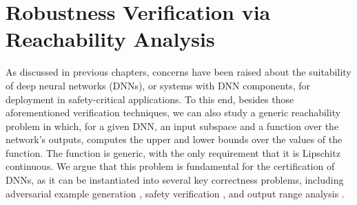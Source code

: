 
\newcommand{\obj}{o}
\newcommand{\off}{w}


\def \eg{{\em e.g.,}}
\def \ie{{\em i.e.,}}
\def \etc{{\em etc.}}
\def \mm{{\em mm}}
\def \cm{{\em cm}}
\def \m{{\em m}}
\def \one{{\em i)}}
\def \two{{\em ii)}}
\def \three{{\em iii)}}
\def \four{{\em iv)}}

\def \Safe{\mathrm{S}}
\def \Robust{\mathrm{R}}


\section{Robustness Verification via Reachability Analysis}\label{chap:reachabilityAnalysis}

As discussed in previous chapters, concerns have been raised about the suitability of deep neural networks (DNNs), or systems with DNN components, for deployment in safety-critical applications. 
%
To this end, besides those aforementioned verification techniques, we can also study a generic reachability problem in which, for a given DNN, an input subspace and a function over the network's outputs, computes the upper and lower bounds over the values of the function. The function is generic, with the only requirement that it is Lipschitz continuous. %
We argue that this problem is fundamental for the certification of DNNs, %
as it can be instantiated into several key correctness problems, including adversarial example generation \cite{szegedy2014intriguing,DBLP:journals/corr/GoodfellowSS14}, safety verification \cite{HKWW2017,katz2017reluplex,RWSHKK201  8}, and output range analysis \cite{LM2017,dutta2017output}.


